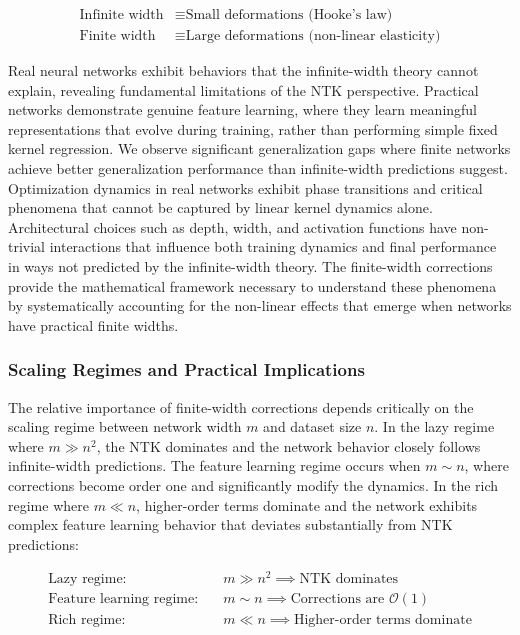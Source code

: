 \documentclass[a4paper]{article}
\theoremstyle{plain}
\theoremstyle{definition}
\theoremstyle{remark}
\begin{document}
\begin{align}
\text{Infinite width} &\equiv \text{Small deformations (Hooke's law)} \nonumber\\
\text{Finite width} &\equiv \text{Large deformations (non-linear elasticity)} \label{eq:physical_analogy}
\end{align}

Real neural networks exhibit behaviors that the infinite-width theory cannot explain, revealing fundamental limitations of the NTK perspective. Practical networks demonstrate genuine feature learning, where they learn meaningful representations that evolve during training, rather than performing simple fixed kernel regression. We observe significant generalization gaps where finite networks achieve better generalization performance than infinite-width predictions suggest. Optimization dynamics in real networks exhibit phase transitions and critical phenomena that cannot be captured by linear kernel dynamics alone. Architectural choices such as depth, width, and activation functions have non-trivial interactions that influence both training dynamics and final performance in ways not predicted by the infinite-width theory. The finite-width corrections provide the mathematical framework necessary to understand these phenomena by systematically accounting for the non-linear effects that emerge when networks have practical finite widths.

\subsubsection{Scaling Regimes and Practical Implications}

The relative importance of finite-width corrections depends critically on the scaling regime between network width $m$ and dataset size $n$. In the lazy regime where $m \gg n^2$, the NTK dominates and the network behavior closely follows infinite-width predictions. The feature learning regime occurs when $m \sim n$, where corrections become order one and significantly modify the dynamics. In the rich regime where $m \ll n$, higher-order terms dominate and the network exhibits complex feature learning behavior that deviates substantially from NTK predictions:

\begin{align}
\text{Lazy regime:} \quad &m \gg n^2 \implies \text{NTK dominates} \nonumber\\
\text{Feature learning regime:} \quad &m \sim n \implies \text{Corrections are } \mathcal{O}(1) \nonumber\\
\text{Rich regime:} \quad &m \ll n \implies \text{Higher-order terms dominate} \label{eq:scaling_regimes}
\end{align}
\end{document}

